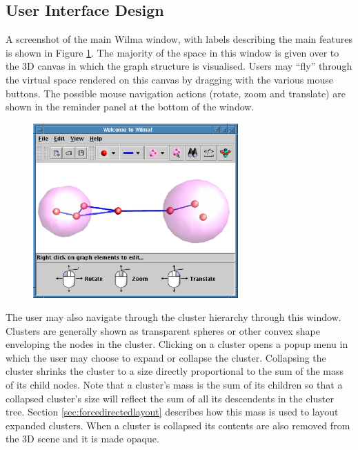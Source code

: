 \documentclass[runningheads]{cl2emult}
\begin{document}
\subsection{User Interface Design}
A screenshot of the main Wilma window, with labels describing the main
features is shown in Figure \ref{fig-controls}.
The majority of the space in this window is given over to the 3D
canvas in which the graph structure is visualised.  Users may ``fly''
through the virtual space rendered on this canvas by dragging with the
various mouse buttons.  The possible mouse navigation actions (rotate,
zoom and translate) are
shown in the reminder panel at the bottom of the window.
\begin{figure}[h]
  \centering
    \label{fig-controls}
    \includegraphics[width=0.7\textwidth]{figures/wilmacontrols.eps}
\end{figure}

The user may also navigate through the cluster hierarchy through this
window.  Clusters are generally shown as transparent spheres or other
convex shape enveloping the nodes in the cluster.  Clicking on a
cluster opens a popup menu in which the user may choose to expand or
collapse the cluster.  Collapsing the cluster shrinks the cluster to a
size directly proportional to the sum of the mass of its child nodes.
Note that a cluster's mass is the sum of its children so that a
collapsed cluster's size will reflect the sum of all its descendents
in the cluster tree.  Section \ref{sec:forcedirectedlayout} describes
how this mass is used to layout expanded clusters.  When a cluster is
collapsed its contents are also removed from the 3D scene and it is
made opaque.
\end{document}
